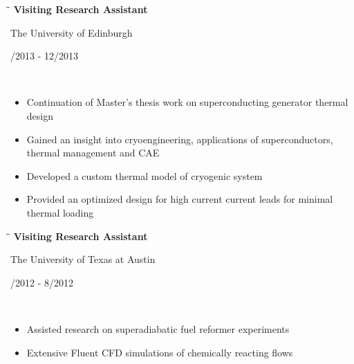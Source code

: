 \documentclass[11pt]{res}
\newcommand{\comment}[1]{}
\begin{document}
\begin{resume}
   \begin{tabbing}
   \hspace{2.7in}\= \hspace{2.3in}\= \kill %
    {\bf Visiting Research Assistant} \> \parbox[c]{6cm}{ \centering The University of Edinburgh}    \> \parbox[c]{3.3cm}{ /2013 - 12/2013} \\
   \end{tabbing}
   \vspace{-18pt}   %
	\begin{itemize}
	    \item Continuation of Master's thesis work on superconducting generator thermal design
	    \item Gained an insight into cryoengineering, applications of superconductors, thermal management and CAE
	    \item Developed a custom thermal model of cryogenic system
	    \item Provided an optimized design for high current current leads for minimal thermal loading
	\end{itemize}
\vspace{-10pt}

   \begin{tabbing}%
   \hspace{2.7in}\= \hspace{2.3in}\= \kill %
   {\bf Visiting Research Assistant}  \> \parbox[c]{6cm}{ \centering The University of Texas at Austin } \> \parbox[c]{3.3cm}{ /2012 - 8/2012}\\
   \end{tabbing}
    \vspace{-18pt}   %
    \begin{itemize}
   	\item Assisted research on superadiabatic fuel reformer experiments
   	\item Extensive Fluent CFD simulations of chemically reacting flows
   	\end{itemize}
\vspace{-10pt}

\comment{
   \begin{tabbing}
   \hspace{2.7in}\= \hspace{2.3in}\= \kill %
    {\bf Undergraduate Research Assistant} \> \parbox[c]{6cm}{ \centering The University of Edinburgh} \> \parbox[c]{3.3cm}{ \raggedleft 9/2011 - 12/2011}\\
   \end{tabbing}
   \vspace{-18pt}   %
    \begin{itemize}
   	\setlength{\leftmargin}{-10pt} \setlength\itemsep{0pt}
   	\item Created an algorithm for processing IR images subsequently used at the University College Dublin and Imperial College London
   	\end{itemize}
\vspace{-5pt}
}


\end{resume}
\end{document}

